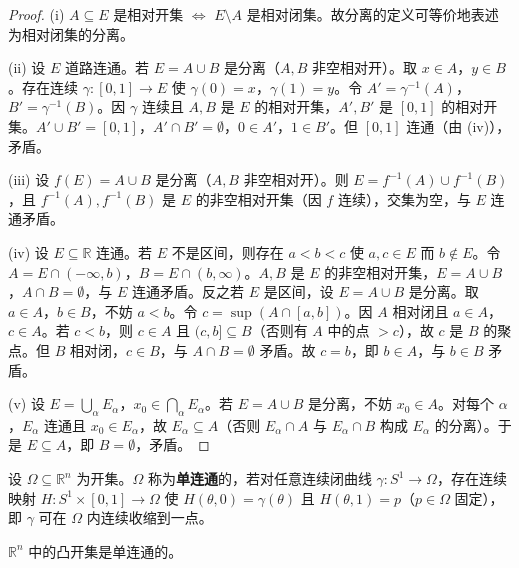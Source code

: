 \begin{proof}
(i) $A \subseteq E$ 是相对开集 $\iff$ $E \setminus A$ 是相对闭集。故分离的定义可等价地表述为相对闭集的分离。

(ii) 设 $E$ 道路连通。若 $E = A \cup B$ 是分离（$A, B$ 非空相对开）。取 $x \in A$，$y \in B$。存在连续 $\gamma: [0, 1] \to E$ 使 $\gamma(0) = x$，$\gamma(1) = y$。令 $A' = \gamma^{-1}(A)$，$B' = \gamma^{-1}(B)$。因 $\gamma$ 连续且 $A, B$ 是 $E$ 的相对开集，$A', B'$ 是 $[0, 1]$ 的相对开集。$A' \cup B' = [0, 1]$，$A' \cap B' = \emptyset$，$0 \in A'$，$1 \in B'$。但 $[0, 1]$ 连通（由 (iv)），矛盾。

(iii) 设 $f(E) = A \cup B$ 是分离（$A, B$ 非空相对开）。则 $E = f^{-1}(A) \cup f^{-1}(B)$，且 $f^{-1}(A), f^{-1}(B)$ 是 $E$ 的非空相对开集（因 $f$ 连续），交集为空，与 $E$ 连通矛盾。

(iv) 设 $E \subseteq \mathbb{R}$ 连通。若 $E$ 不是区间，则存在 $a < b < c$ 使 $a, c \in E$ 而 $b \notin E$。令 $A = E \cap (-\infty, b)$，$B = E \cap (b, \infty)$。$A, B$ 是 $E$ 的非空相对开集，$E = A \cup B$，$A \cap B = \emptyset$，与 $E$ 连通矛盾。反之若 $E$ 是区间，设 $E = A \cup B$ 是分离。取 $a \in A$，$b \in B$，不妨 $a < b$。令 $c = \sup(A \cap [a, b])$。因 $A$ 相对闭且 $a \in A$，$c \in A$。若 $c < b$，则 $c \in A$ 且 $(c, b] \subseteq B$（否则有 $A$ 中的点 $> c$），故 $c$ 是 $B$ 的聚点。但 $B$ 相对闭，$c \in B$，与 $A \cap B = \emptyset$ 矛盾。故 $c = b$，即 $b \in A$，与 $b \in B$ 矛盾。

(v) 设 $E = \bigcup_\alpha E_\alpha$，$x_0 \in \bigcap_\alpha E_\alpha$。若 $E = A \cup B$ 是分离，不妨 $x_0 \in A$。对每个 $\alpha$，$E_\alpha$ 连通且 $x_0 \in E_\alpha$，故 $E_\alpha \subseteq A$（否则 $E_\alpha \cap A$ 与 $E_\alpha \cap B$ 构成 $E_\alpha$ 的分离）。于是 $E \subseteq A$，即 $B = \emptyset$，矛盾。
\end{proof}

\begin{definition}[单连通性]\label{def:simply_connected}
设 $\Omega \subseteq \mathbb{R}^n$ 为开集。$\Omega$ 称为\textbf{单连通}的，若对任意连续闭曲线 $\gamma: S^1 \to \Omega$，存在连续映射 $H: S^1 \times [0, 1] \to \Omega$ 使 $H(\theta, 0) = \gamma(\theta)$ 且 $H(\theta, 1) = p$（$p \in \Omega$ 固定），即 $\gamma$ 可在 $\Omega$ 内连续收缩到一点。
\end{definition}

\begin{proposition}\label{prop:convex_simply_connected}
$\mathbb{R}^n$ 中的凸开集是单连通的。
\end{proposition}

